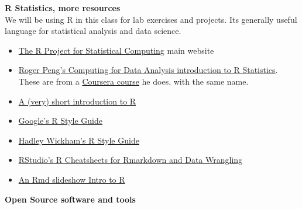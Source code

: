 \documentclass[10pt]{article} %
\begin{document}
    {\bf R Statistics, more resources} \\
       We will be using R in this class for lab exercises and projects. Its generally useful language for statistical analysis and data science.
      \begin{itemize}
        \item \href{"http://www.r-project.org/index.html"}{The R Project for Statistical Computing}  \cite{r_r_2014} main website
        \item \href{"https://www.youtube.com/user/rdpeng/playlists"}{Roger Peng's Computing for Data Analysis introduction to R Statistics}.
        These are from a \href{"https://www.coursera.org/course/compdata"} {Coursera course} he does, with the same name. \cite{peng_computing_2014}\item \href{"http://cran.r-project.org/doc/contrib/Torfs+Brauer-Short-R-Intro.pdf"}{A (very) short introduction to R}  \cite{torfs_very_2014}
        \item \href{"https://google-styleguide.googlecode.com/svn/trunk/Rguide.xml"}{ Google's R Style Guide}
        \item \href{"http://stat405.had.co.nz/r-style.html"}{ Hadley Wickham's R Style Guide}
        \item \href{"http://www.rstudio.com/resources/cheatsheets/"}{ RStudio's R Cheatsheets for Rmarkdown and Data Wrangling}
        \item \href{"http://www.theresearchkitchen.com/blog"}{An Rmd slideshow Intro to R}
      \end{itemize}

    {\bf Open Source software and tools} \\
\end{document}
